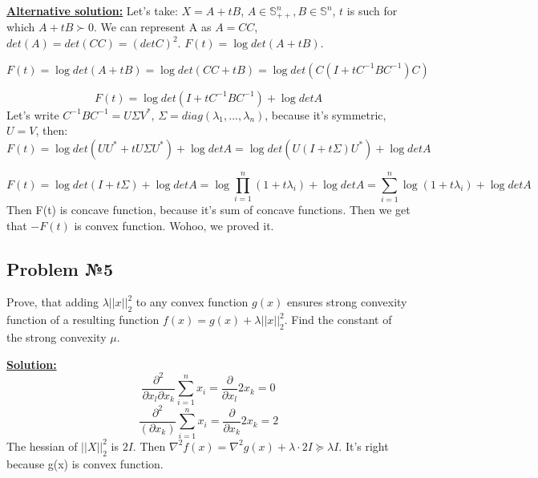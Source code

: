 \underline{\textbf{Alternative solution:}}
Let's take: $X = A + tB$, $A \in \mathds{S}_{++}^n, B \in \mathds{S}^n$, $t$ is such for which $A + tB \succ 0$. We can represent A as $A = CC$, $det(A) = det(CC) = (detC)^2$.
\newline 
$F(t) = \log det(A + tB)$.

\begin{equation*}
    F(t) = \log det(A + tB) = \log det(CC + tB) = \log det(C(I + t C^{-1}BC^{-1})C) 
\end{equation*}

\begin{equation*}
    F(t) = \log det(I + tC^{-1}BC^{-1}) + \log detA
\end{equation*}
Let's write $C^{-1}BC^{-1} = U \Sigma V^*$, $\Sigma = diag(\lambda_1, ..., \lambda_n)$, because it's symmetric, $U = V$, then:
\begin{equation*}
    F(t) = \log det(UU^* + tU\Sigma U^*) + \log detA = \log det(U(I + t\Sigma)U^*) + \log detA 
\end{equation*}

\begin{equation*}
    F(t) = \log det(I + t \Sigma) + \log detA = \log \prod\limits_{i=1}^n(1 + t \lambda_i) + \log detA= \sum\limits_{i=1}^n \log(1 + t\lambda_i) + \log detA
\end{equation*}
Then F(t) is concave function, because it's sum of concave functions. Then we get that $-F(t)$ is convex function. Wohoo, we proved it.


\subsection{Problem №5}

Prove, that adding $\lambda ||x||_2^2$ to any convex function $g(x)$ ensures strong convexity function of a resulting function $f(x) = g(x) + \lambda ||x||_2^2$. Find the constant of the strong convexity $\mu$.

\underline{\textbf{Solution:}}
\begin{equation*}
    \frac{\partial^2}{\partial x_l \partial x_k} \sum\limits_{i = 1}^n x_i = \frac{\partial}{\partial x_l} 2x_k = 0
\end{equation*}
\begin{equation*}
    \frac{\partial^2}{(\partial x_k)} \sum\limits_{i = 1}^n x_i = \frac{\partial}{\partial x_k} 2x_k = 2
\end{equation*}
The hessian of $||X||_2^2$ is $2 I$. Then $\nabla^2 f(x) = \nabla^2 g(x) + \lambda \cdot 2I \succcurlyeq \lambda I$. It's right because g(x) is convex function.

